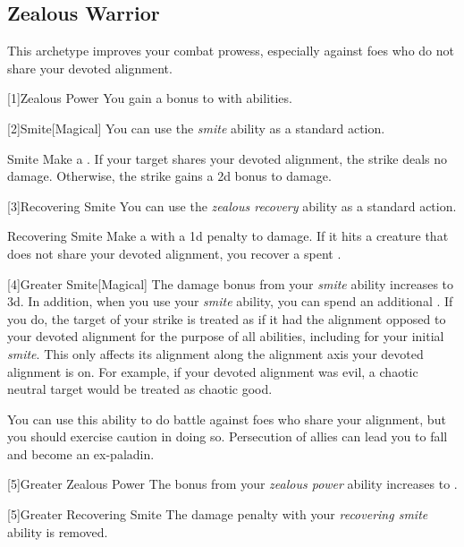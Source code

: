     \subsection{Zealous Warrior}
        This archetype improves your combat prowess, especially against foes who do not share your devoted alignment.

        [1]{Zealous Power} You gain a  bonus to  with  abilities.

        [2]{Smite}[Magical] You can use the \textit{smite} ability as a standard action.
        \begin{apability}{Smite}
            Make a .
            If your target shares your devoted alignment, the strike deals no damage.
            Otherwise, the strike gains a \plus2d bonus to damage.
        \end{apability}

        [3]{Recovering Smite} You can use the \textit{zealous recovery} ability as a standard action.
        \begin{freeability}{Recovering Smite}
            Make a  with a \minus1d penalty to damage.
            If it hits a creature that does not share your devoted alignment, you recover a spent .
        \end{freeability}

        [4]{Greater Smite}[Magical] The damage bonus from your \textit{smite} ability increases to \plus3d.
        In addition, when you use your \textit{smite} ability, you can spend an additional .
        If you do, the target of your strike is treated as if it had the alignment opposed to your devoted alignment for the purpose of all abilities, including for your initial \textit{smite}.
        This only affects its alignment along the alignment axis your devoted alignment is on.
        For example, if your devoted alignment was evil, a chaotic neutral target would be treated as chaotic good.

        You can use this ability to do battle against foes who share your alignment, but you should exercise caution in doing so.
        Persecution of allies can lead you to fall and become an ex-paladin.

        [5]{Greater Zealous Power} The bonus from your \textit{zealous power} ability increases to .

        [5]{Greater Recovering Smite} The damage penalty with your \textit{recovering smite} ability is removed.


